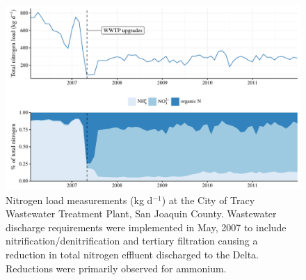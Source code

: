 \documentclass[letterpaper,12pt,oneside]{article}\usepackage[]{graphicx}\usepackage[]{color}
\begin{document}
\begin{figure}[!ht]

{\centering \includegraphics[width=\textwidth]{figs/tracy-1} 

}

\caption[Nitrogen load measurements (kg d$^{-1}$) at the City of Tracy Wastewater Treatment Plant, San Joaquin County]{Nitrogen load measurements (kg d$^{-1}$) at the City of Tracy Wastewater Treatment Plant, San Joaquin County.  Wastewater discharge requirements were implemented in May, 2007 to include nitrification/denitrification and tertiary filtration causing a reduction in total nitrogen effluent discharged to the Delta. Reductions were primarily observed for ammonium.}\label{fig:tracy}
\end{figure}
\end{document}
